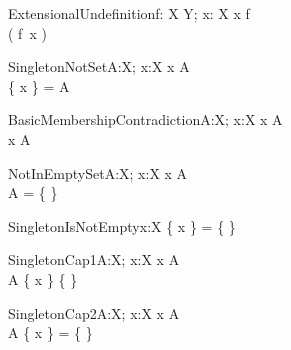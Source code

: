 
\begin{theorem}{ExtensionalUndefinition}{f: X \pfun Y; x: X}
x \notin \dom f \\
\sw( f~x ) \\
\end{theorem}





\begin{theorem}{SingletonNotSet}{A:\power X; x:X}
x \notin A \\
\{ x \} = A
\end{theorem}

\begin{theorem}{BasicMembershipContradiction}{A:\power X; x:X}
x \in A \\
x \notin A
\end{theorem}

\begin{theorem}{NotInEmptySet}{A:\power X; x:X}
x \in A \\
A = \{ \}
\end{theorem}

\begin{theorem}{SingletonIsNotEmpty}{x:X}
\{ x \} = \{ \}
\end{theorem}

\begin{theorem}{SingletonCap1}{A:\power X; x:X}
x \notin A \\
A \cap \{ x \} \neq \{ \}
\end{theorem}

\begin{theorem}{SingletonCap2}{A:\power X; x:X}
x \in A \\
A \cap \{ x \} = \{ \}
\end{theorem}

